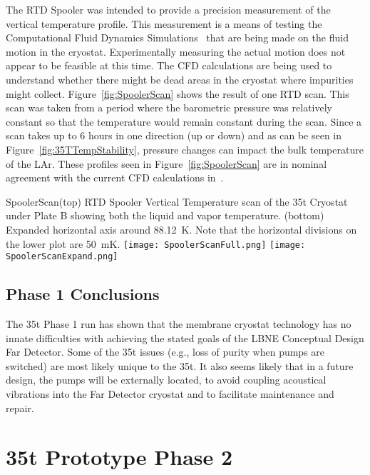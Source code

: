 The RTD Spooler was intended to provide a precision measurement of the vertical temperature profile. 
This measurement is a means of testing the Computational Fluid Dynamics Simulations~\cite{fd_01_9940} that 
are being made on the fluid motion in the cryostat. Experimentally measuring the actual motion does not 
appear to be feasible at this time. The CFD calculations are being used to understand whether there 
might be dead areas in the cryostat where impurities might collect. Figure~\ref{fig:SpoolerScan} shows the result of one RTD 
scan. This scan was taken from a period where the barometric pressure was relatively constant so that 
the temperature would remain constant during the scan. Since a scan takes up to 6 hours in one direction 
(up or down) and as can be seen in Figure~\ref{fig:35TTempStability}, pressure changes can impact the 
bulk temperature of the LAr. These profiles seen in Figure~\ref{fig:SpoolerScan} are in nominal 
agreement with the current CFD calculations in~\cite{fd_01_9940}.


\begin{cdrfigure}{SpoolerScan}{(top) RTD Spooler Vertical Temperature scan of the 35t Cryostat under Plate B showing both the liquid and vapor temperature.  (bottom) Expanded horizontal axis around 88.12~K. Note that the horizontal divisions on the lower plot are 50~mK. }
\texttt{[image: SpoolerScanFull.png]}
\texttt{[image: SpoolerScanExpand.png]}  
\end{cdrfigure}

\subsection{Phase 1 Conclusions}

The 35t Phase 1 run has shown that the membrane cryostat technology has no innate difficulties with 
achieving the stated goals of the LBNE Conceptual Design Far Detector. Some of the 35t issues (e.g., loss 
of purity when pumps are switched) are most likely unique to the 35t. It also seems likely that in a future 
design, the pumps will be externally located, to avoid coupling acoustical vibrations into the Far Detector 
cryostat and to facilitate maintenance and repair.

\section{35t Prototype Phase 2}
\label{sec:35t-ph2}

